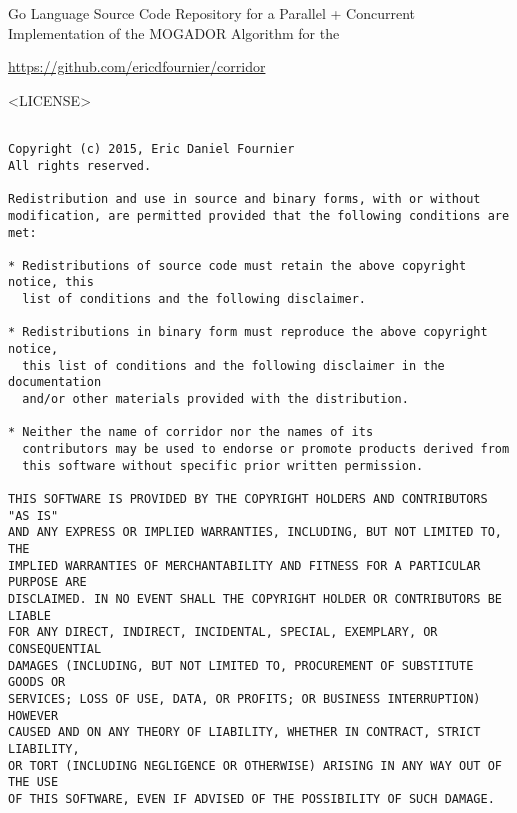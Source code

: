 \chapter{}
\label{A}

Go Language Source Code Repository for a Parallel + Concurrent Implementation of the MOGADOR Algorithm for the 

\begin{center}
    
    \url{https://github.com/ericdfournier/corridor}
    
\end{center}

\newpage

<LICENSE>

\begin{lstlisting}[basicstyle=\tiny]

Copyright (c) 2015, Eric Daniel Fournier
All rights reserved.

Redistribution and use in source and binary forms, with or without
modification, are permitted provided that the following conditions are met:

* Redistributions of source code must retain the above copyright notice, this
  list of conditions and the following disclaimer.

* Redistributions in binary form must reproduce the above copyright notice,
  this list of conditions and the following disclaimer in the documentation
  and/or other materials provided with the distribution.

* Neither the name of corridor nor the names of its
  contributors may be used to endorse or promote products derived from
  this software without specific prior written permission.

THIS SOFTWARE IS PROVIDED BY THE COPYRIGHT HOLDERS AND CONTRIBUTORS "AS IS"
AND ANY EXPRESS OR IMPLIED WARRANTIES, INCLUDING, BUT NOT LIMITED TO, THE
IMPLIED WARRANTIES OF MERCHANTABILITY AND FITNESS FOR A PARTICULAR PURPOSE ARE
DISCLAIMED. IN NO EVENT SHALL THE COPYRIGHT HOLDER OR CONTRIBUTORS BE LIABLE
FOR ANY DIRECT, INDIRECT, INCIDENTAL, SPECIAL, EXEMPLARY, OR CONSEQUENTIAL
DAMAGES (INCLUDING, BUT NOT LIMITED TO, PROCUREMENT OF SUBSTITUTE GOODS OR
SERVICES; LOSS OF USE, DATA, OR PROFITS; OR BUSINESS INTERRUPTION) HOWEVER
CAUSED AND ON ANY THEORY OF LIABILITY, WHETHER IN CONTRACT, STRICT LIABILITY,
OR TORT (INCLUDING NEGLIGENCE OR OTHERWISE) ARISING IN ANY WAY OUT OF THE USE
OF THIS SOFTWARE, EVEN IF ADVISED OF THE POSSIBILITY OF SUCH DAMAGE.

\end{lstlisting}

